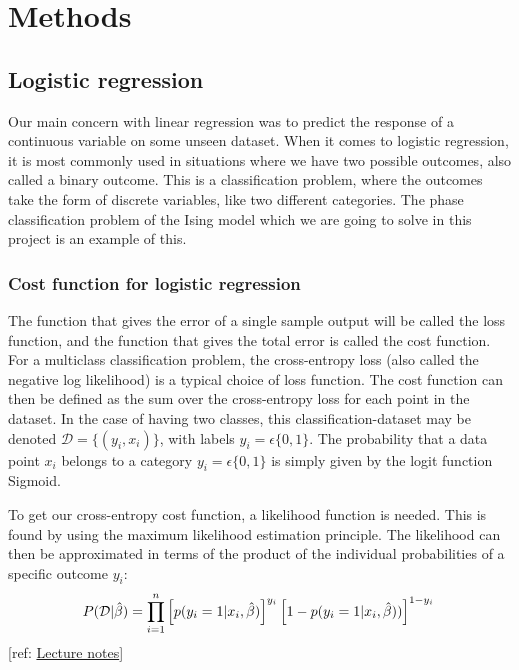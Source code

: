 \documentclass[a4paper,12pt]{article}
\begin{document}
\section{Methods}

\subsection{Logistic regression}
Our main concern with linear regression was to predict the response of a continuous variable on some unseen dataset. When it comes to logistic regression, it is most commonly used in situations where we have two possible outcomes, also called a binary outcome. This is a classification problem, where the outcomes take the form of discrete variables, like two different categories. The phase classification problem of the Ising model which we are going to solve in this project is an example of this.

\subsubsection{Cost function for logistic regression}
The function that gives the error of a single sample output will be called the loss function, and the function that gives the total error is called the cost function. For a multiclass classification problem, the cross-entropy loss (also called the negative log likelihood) is a typical choice of loss function. The cost function can then be defined as the sum over the cross-entropy loss for each point in the dataset. In the case of having two classes, this classification-dataset may be denoted {$\mathcal{D} = \{(y_i, x_i)\}$}, with labels $y_i = \epsilon \{0, 1\}$. The probability that a data point $x_i$ belongs to a category $y_i = \epsilon \{0, 1\}$ is simply given by the logit function Sigmoid.\newline
 
 To get our cross-entropy cost function, a likelihood function is needed. This is found by using the maximum likelihood estimation principle. The likelihood can then be approximated in terms of the product of the individual probabilities of a specific outcome $y_i$:
 \begin{equation}
     P(\mathcal{D}|\hat{\beta}) = \prod_{i=1}^n \left[p(y_i=1|x_i,\hat{\beta})\right]^{y_i}\left[1-p(y_i=1|x_i,\hat{\beta}))\right]^{1-y_i}\nonumber \\
 \end{equation}
 [ref: \href{https://compphysics.github.io/MachineLearning/doc/pub/LogReg/pdf/LogReg-minted.pdf}{Lecture notes}]\newline
 
\end{document}
